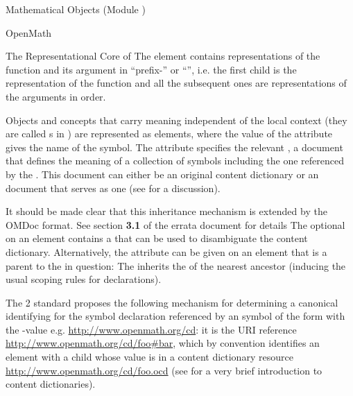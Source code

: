 \begin{tchapter}[id=mobj,short=Mathematical Objects]{Mathematical Objects (Module {})}
\begin{tsection}[id=openmath]{OpenMath}
\begin{tsubsection}[id=om:core]{The Representational Core of {\openmath}}
The {} element contains representations of the function and its
argument in ``prefix-'' or ``{}'',
i.e. the first child is the representation of the function and all the subsequent ones are
representations of the arguments in order.

Objects and concepts that carry meaning independent of the local context (they are called
{s} in {\openmath}) are represented as {} elements,
where the value of the {} attribute gives the name of the
symbol.  The {} attribute specifies the relevant
{}, a document that defines the meaning of a collection of
symbols including the one referenced by the {}.  This document can
either be an original {\openmath} content dictionary or an {\omdoc} document that serves
as one (see {} for a discussion). 
\begin{erratum}[reported-by=Michael Kohlhase,date=2008-09-25,type=clarification]{It should
    be made clear that this inheritance mechanism is extended by the OMDoc format. See
    section {\textbf{3.1}} of the errata document for details}
  The optional {} on an {} element contains
  a {} that can be used to disambiguate the content dictionary.
  Alternatively, the {} attribute can be given on an {\openmath}
  element that is a parent to the {} in question: The
  {} inherits the {} of the nearest
  ancestor (inducing the usual {\xml} scoping rules for declarations).
\end{erratum}

The {\openmath}2 standard proposes the following mechanism for determining a canonical
identifying {} for the symbol declaration referenced by an {\openmath}
symbol of the form {} with the
{}-value e.g.  \url{http://www.openmath.org/cd}: it is the URI
reference \url{http://www.openmath.org/cd/foo#bar}, which by convention identifies an
{} element with a child {}
whose value is {} in a content dictionary resource
\url{http://www.openmath.org/cd/foo.ocd} (see {} for a
very brief introduction to {\openmath} content dictionaries). 


\end{tsubsection}
\end{tsection}
\end{tchapter}
